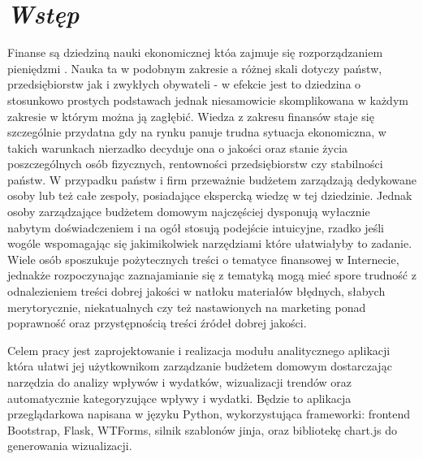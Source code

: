 \documentclass[a4paper,10pt, twoside]{report}
\newcommand{\customstylechapter}[1]{\large{\textit{#1}}}
\begin{document}
\null\newpage %

\renewcommand*\contentsname{Spis treści}
\tableofcontents                    %




\chapter{\customstylechapter{Wstęp}}
{Finanse są dziedziną nauki ekonomicznej któa zajmuje się rozporządzaniem 
pieniędzmi \cite{wiki_ekonomia}. Nauka ta w podobnym zakresie a różnej skali 
dotyczy państw, przedsiębiorstw jak i zwykłych obywateli - w efekcie jest to 
dziedzina o stosunkowo prostych podstawach jednak niesamowicie skomplikowana w 
każdym zakresie w którym można ją zagłębić. Wiedza z zakresu finansów staje się 
szczególnie przydatna gdy na rynku panuje trudna sytuacja ekonomiczna, w takich 
warunkach nierzadko decyduje ona o jakości oraz stanie życia poszczególnych 
osób fizycznych, rentowności przedsiębiorstw czy stabilności państw. W przypadku
 państw i firm przeważnie budżetem zarządzają dedykowane osoby lub też całe 
zespoły, posiadające ekspercką wiedzę w tej dziedzinie. Jednak osoby 
zarządzające budżetem domowym najczęściej dysponują wyłacznie nabytym 
doświadczeniem i na ogół stosują podejście intuicyjne, rzadko jeśli wogóle 
wspomagając się jakimikolwiek narzędziami które ułatwiałyby to zadanie. Wiele 
osób sposzukuje pożytecznych treści o tematyce finansowej w Internecie, jednakże 
rozpoczynając zaznajamianie się z tematyką mogą mieć spore trudność z 
odnalezieniem treści dobrej jakości w natłoku materiałów błędnych, słabych 
merytorycznie, niekatualnych czy też nastawionych na marketing ponad poprawność 
oraz przystępnością treści źródeł dobrej jakości.}

\medskip
{Celem pracy jest zaprojektowanie i realizacja modułu analitycznego aplikacji 
która ułatwi jej użytkownikom zarządzanie budżetem domowym dostarczając 
narzędzia do analizy wpływów i wydatków, wizualizacji trendów oraz automatycznie 
kategoryzujące wpływy i wydatki. Będzie to aplikacja przeglądarkowa napisana w 
języku Python, wykorzystująca frameworki: frontend Bootstrap\cite{Bootstrap}, 
Flask\cite{Flask}, WTForms\cite{WTForms}, silnik szablonów jinja\cite{jinja}, 
oraz bibliotekę chart.js\cite{chart.js} do generowania wizualizacji.}
\end{document}

